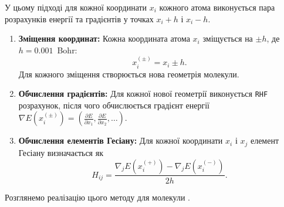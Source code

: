 У цьому підході для кожної координати $x_i$ кожного атома виконується пара розрахунків енергії та градієнтів у точках $x_i + h$ і $x_i - h$.

\begin{enumerate}
    \item \textbf{Зміщення координат:}
    Кожна координата атома $x_i$ зміщується на $\pm h$, де $h = 0.001$~Bohr:
    \[
        x_i^{(\pm)} = x_i \pm h.
    \]
    Для кожного зміщення створюється нова геометрія молекули.

    \item \textbf{Обчислення градієнтів:}
    Для кожної нової геометрії виконується \texttt{RHF} розрахунок, після чого обчислюється градієнт енергії
    \(\nabla E(x_i^{(\pm)}) = \left( \frac{\partial E}{\partial x_1}, \frac{\partial E}{\partial x_2}, \ldots \right)\).

    \item \textbf{Обчислення елементів Гесіану:}
    Для кожної координати $x_i$ і $x_j$ елемент Гесіану визначається як
    \[
        H_{ij} = \frac{\nabla_j E(x_i^{(+)}) - \nabla_j E(x_i^{(-)})}{2h}.
    \]
\end{enumerate}

Розглянемо реалізацію цього методу для молекули .

